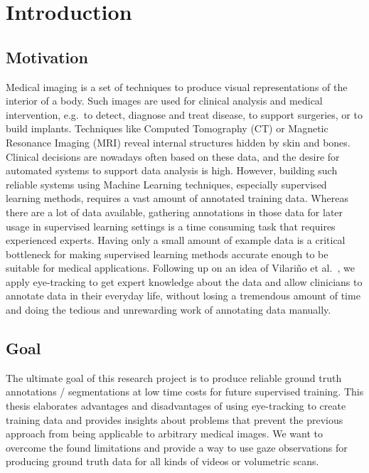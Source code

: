 \chapter{Introduction}
\label{chap:introduction}

\section{Motivation}
      Medical imaging is a set of techniques to produce visual representations of the interior of a body. 
      Such images are used for clinical analysis and medical intervention, e.g.\ to detect, diagnose and treat disease, to support surgeries, or to build implants. 
      Techniques like Computed Tomography (CT) or Magnetic Resonance Imaging (MRI) reveal internal structures hidden by skin and bones. 
      Clinical decisions are nowadays often based on these data, and the desire for automated systems to support data analysis is high. 
      However, building such reliable systems using Machine Learning techniques, especially supervised learning methods, requires a vast amount of annotated training data. 
      Whereas there are a lot of data available, gathering annotations in those data for later usage in supervised learning settings is a time consuming task that requires experienced experts. Having only a small amount of example data is a critical bottleneck for making supervised learning methods accurate enough to be suitable for medical applications.
      Following up on an idea of Vilari\~no et al.\ \cite{vilarino2007automatic}, we apply eye-tracking to get expert knowledge about the data and allow clinicians to annotate data in their everyday life, without losing a tremendous amount of time and doing the tedious and unrewarding work of annotating data manually.
  
\section{Goal}
The ultimate goal of this research project is to produce reliable ground truth annotations / segmentations at low time costs for future supervised training. 
This thesis elaborates advantages and disadvantages of using eye-tracking to create training data and provides insights about problems that prevent the previous approach \cite{vilarino2007automatic} from being applicable to arbitrary medical images. We want to overcome the found limitations and provide a way to use gaze observations for producing ground truth data for all kinds of videos or volumetric scans.

